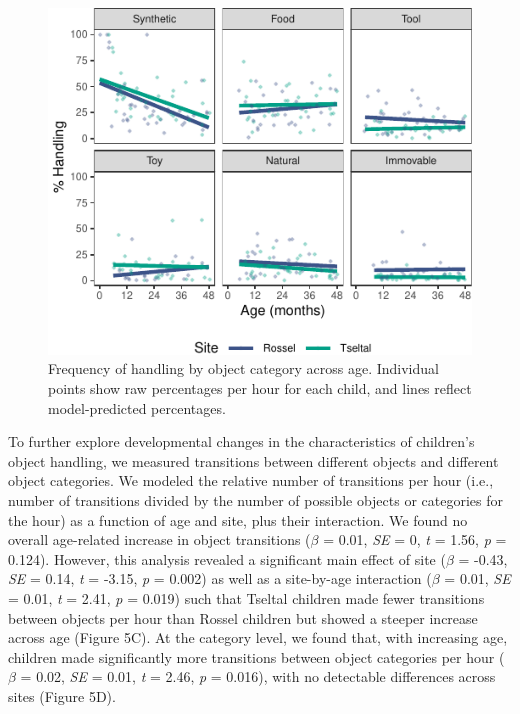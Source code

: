 \documentclass[10pt, letterpaper]{article}
\newenvironment{CodeChunk}{}{}
\begin{document}
\begin{CodeChunk}
\begin{figure}[!ht]

{\centering \includegraphics{figs/age-effects-bycategory-fig-1} 

}

\caption[Frequency of handling by object category across age]{Frequency of handling by object category across age. Individual points show raw percentages per hour for each child, and lines reflect model-predicted percentages.}\label{fig:age-effects-bycategory-fig}
\end{figure}
\end{CodeChunk}

To further explore developmental changes in the characteristics of
children's object handling, we measured transitions between different
objects and different object categories. We modeled the relative number
of transitions per hour (i.e., number of transitions divided by the
number of possible objects or categories for the hour) as a function of
age and site, plus their interaction. We found no overall age-related
increase in object transitions (\(\beta\) = 0.01, \emph{SE} = 0,
\emph{t} = 1.56, \emph{p} = 0.124). However, this analysis revealed a
significant main effect of site (\(\beta\) = -0.43, \emph{SE} = 0.14,
\emph{t} = -3.15, \emph{p} = 0.002) as well as a site-by-age interaction
(\(\beta\) = 0.01, \emph{SE} = 0.01, \emph{t} = 2.41, \emph{p} = 0.019)
such that Tseltal children made fewer transitions between objects per
hour than Rossel children but showed a steeper increase across age
(Figure 5C). At the category level, we found that, with increasing age,
children made significantly more transitions between object categories
per hour (\(\beta\) = 0.02, \emph{SE} = 0.01, \emph{t} = 2.46, \emph{p}
= 0.016), with no detectable differences across sites (Figure 5D).
\end{document}
